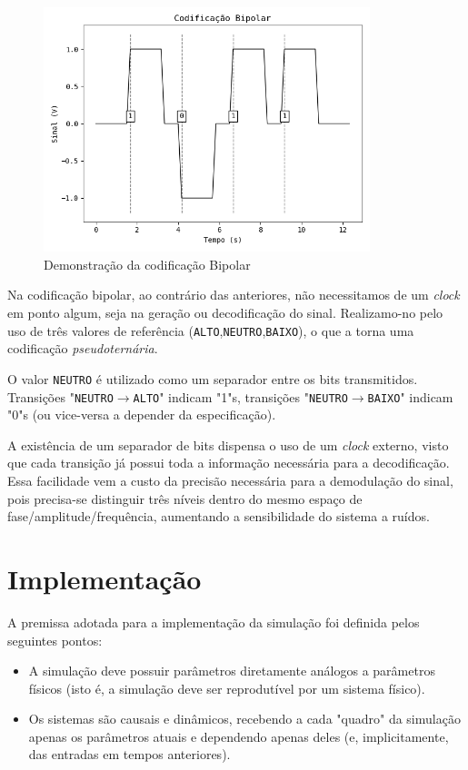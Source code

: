 \documentclass[titlepage,twocolumn]{article}
\begin{document}
\begin{figure}[H]
    \begin{center}
        \includegraphics[width=9.5cm]{imgs/codificacao_bipolar.png}
        \caption{Demonstração da codificação Bipolar}
        \label{fig:bipolar}
    \end{center}
\end{figure}

Na codificação bipolar, ao contrário das anteriores, não necessitamos de um \textit{clock} em ponto algum, seja na geração ou decodificação do sinal. Realizamo-no pelo uso de três valores de referência (\texttt{ALTO},\texttt{NEUTRO},\texttt{BAIXO}), o que a torna uma codificação \textit{pseudoternária}.

O valor \texttt{NEUTRO} é utilizado como um separador entre os bits transmitidos. Transições "\texttt{NEUTRO}$\rightarrow$\texttt{ALTO}" indicam "1"s, transições "\texttt{NEUTRO}$\rightarrow$\texttt{BAIXO}" indicam "0"s (ou vice-versa a depender da especificação).

A existência de um separador de bits dispensa o uso de um \textit{clock} externo, visto que cada transição já possui toda a informação necessária para a decodificação. Essa facilidade vem a custo da precisão necessária para a demodulação do sinal, pois precisa-se distinguir três níveis dentro do mesmo espaço de fase/amplitude/frequência, aumentando a sensibilidade do sistema a ruídos.

\section{Implementação}

A premissa adotada para a implementação da simulação foi definida pelos seguintes pontos:

\begin{itemize}
    \item A simulação deve possuir parâmetros diretamente análogos a parâmetros físicos (isto é, a simulação deve ser reprodutível por um sistema físico).
    \item Os sistemas são causais e dinâmicos, recebendo a cada "quadro" da simulação apenas os parâmetros atuais e dependendo apenas deles (e, implicitamente, das entradas em tempos anteriores).
\end{itemize}
\end{document}
